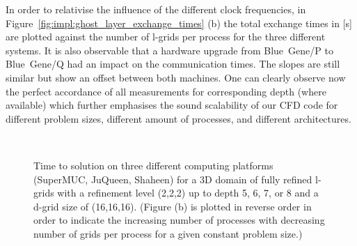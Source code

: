 \documentclass[10pt, conference, compsocconf]{IEEEtran}
\begin{document}
In order to relativise the influence of the different clock frequencies, in Figure~\ref{fig:impl:ghost_layer_exchange_times} (b) the total exchange times in [s] are plotted against the number of l-grids per process for the three different systems. It is also observable that a hardware upgrade from Blue~Gene/P to Blue~Gene/Q had an impact on the communication times. The slopes are still similar but show an offset between both machines. One can clearly observe now the perfect accordance of all measurements for corresponding depth (where available) which further emphasises the sound scalability of our CFD code for different problem sizes, different amount of processes, and different architectures.

\begin{figure}[!htbp]
	\centering
	 \\
	\caption{Time to solution on three different computing platforms (SuperMUC, JuQueen, Shaheen) for a 3D domain of fully refined l-grids with a refinement level (2,2,2) up to depth 5, 6, 7, or 8 and a d-grid size of (16,16,16). (Figure (b) is plotted in reverse order in order to indicate the increasing number of processes with decreasing number of grids per process for a given constant problem size.)}
	\label{fig:impl:time_to_solution}
\end{figure}
\end{document}
